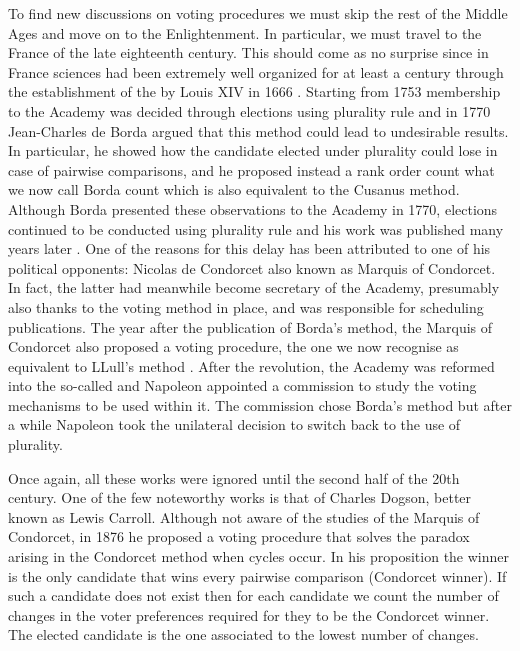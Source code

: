 To find new discussions on voting procedures we must skip the rest of the Middle Ages and move on to the Enlightenment. In particular, we must travel to the France of the late eighteenth century. This should come as no surprise since in France sciences had been extremely well organized for at least a century through the establishment of the  by Louis XIV in 1666 \citep{Demeulenaere1995}. Starting from 1753 membership to the Academy was decided through elections using plurality rule and in 1770 Jean-Charles de Borda argued that this method could lead to undesirable results. In particular, he showed how the candidate elected under plurality could lose in case of pairwise comparisons, and he proposed instead a rank order count \textemdash what we now call Borda count which is also equivalent to the Cusanus method. Although Borda presented these observations to the Academy in 1770, elections continued to be conducted using plurality rule and his work was published many years later \citep{Borda1784}.
One of the reasons for this delay has been attributed to one of his political opponents: Nicolas de Condorcet \citep{Urken2004} \textemdash also known as Marquis of Condorcet. In fact, the latter had meanwhile become secretary of the Academy, presumably also thanks to the voting method in place, and was responsible for scheduling publications. %
The year after the publication of Borda's method, the Marquis of Condorcet also proposed a voting procedure, the one we now recognise as equivalent to LLull's method \citep{Condorcet1785}.
After the revolution, the Academy was reformed into the so-called  and Napoleon appointed a commission to study the voting mechanisms to be used within it. The commission chose Borda's method but after a while Napoleon took the unilateral decision to switch back to the use of plurality.

Once again, all these works were ignored until the second half of the 20th century. One of the few noteworthy works is that of Charles Dogson, better known as Lewis Carroll. Although not aware of the studies of the Marquis of Condorcet, in 1876 he proposed a voting procedure that solves the paradox arising in the Condorcet method when cycles occur.
In his proposition the winner is the only candidate that wins every pairwise comparison (Condorcet winner). If such a candidate does not exist then for each candidate we count the number of changes in the voter preferences required for they to be the Condorcet winner. The elected candidate is the one associated to the lowest number of changes.


